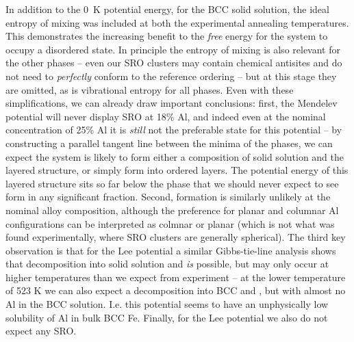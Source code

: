 In addition to the 0~K potential energy, for the BCC solid solution, the ideal entropy of mixing was included at both the experimental annealing temperatures.
This demonstrates the increasing benefit to the \emph{free} energy for the system to occupy a disordered state.
In principle the entropy of mixing is also relevant for the other phases -- even our SRO clusters may contain chemical antisites and do not need to \emph{perfectly} conform to the reference ordering -- but at this stage they are omitted, as is vibrational entropy for all phases.
Even with these simplifications, we can already draw important conclusions: first, the Mendelev potential will never display \DOTHREE SRO at 18\% Al, and indeed even at the nominal \DOTHREE concentration of 25\% Al it is \emph{still} not the preferable state for this potential -- by constructing a parallel tangent line between the minima of the phases, we can expect the system is likely to form either a composition of solid solution and the layered structure, or simply form into ordered layers.
The potential energy of this layered structure sits so far below the \DOTHREE phase that we should never expect to see \DOTHREE form in any significant fraction.
Second, \BTWO formation is similarly unlikely at the nominal alloy composition, although the preference for planar and columnar Al configurations can be interpreted as colmnar or planar \BTWO (which is not what was found experimentally, where \BTWO SRO clusters are generally spherical).
The third key observation is that for the Lee potential a similar Gibbs-tie-line analysis shows that decomposition into solid solution and \DOTHREE \emph{is} possible, but may only occur at higher temperatures than we expect from experiment -- at the lower temperature of 523 K we can also expect a decomposition into BCC and \DOTHREE, but with almost no Al in the BCC solution.
I.e. this potential seems to have an unphysically low solubility of Al in bulk BCC Fe.
Finally, for the Lee potential we also do not expect any \BTWO SRO.

